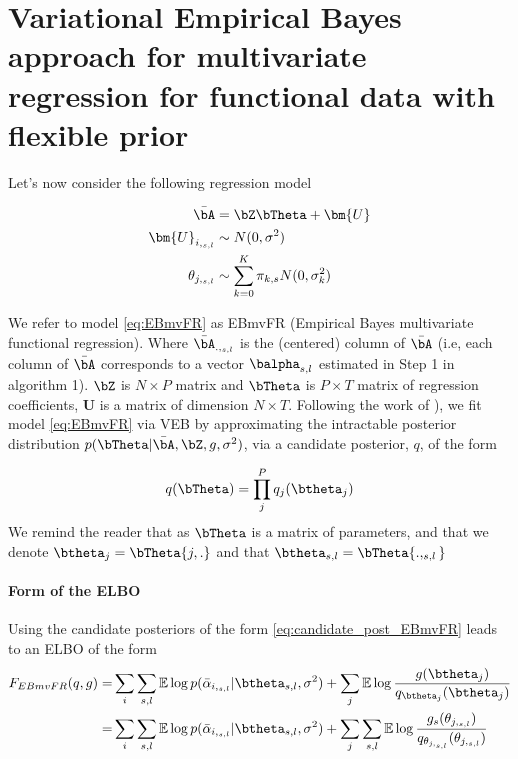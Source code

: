  
 
\section{Variational Empirical Bayes approach for multivariate  regression for functional data  with flexible prior}\label{sec:EBmvFR}
Let's now consider the following regression model

\begin{align}
    \bar{\bA} & = \bZ  \bTheta+\bm{U}  \label{eq:EBmvFR}\\
    \bm{U}_{i,_{s,l}} &   \sim N(0,\sigma^2) \\
    \theta_{j,_{ s,l}} &  \sim \sum_{k=0}^K \pi_{k ,s} N(0,\sigma_{k }^2)\\
\end{align}

We refer to model \ref{eq:EBmvFR} as EBmvFR (Empirical Bayes multivariate functional regression). Where  $ \bar{\bA}_{.,_{s,l}}$ is the (centered) column of $\bar{\bA}$  (i.e, each column of $\bar{\bA}$ corresponds to a vector $\balpha_{s,l}$ estimated in Step 1 in algorithm 1).   $\bZ$ is $N\times P$ matrix and  $ \bTheta$ is $P\times T$ matrix of regression coefficients,  $\bm{U}$ is a matrix of dimension $N\times T$.  Following the work of \cite{kim_flexible_2022}), we fit model \ref{eq:EBmvFR} via VEB by approximating the intractable posterior distribution
$    p(\bTheta |\bar{\bA}  ,\bZ,g, \sigma^2)  $, via a candidate posterior, $q$, of the form

\begin{align}
    q(\bTheta) = \prod_j^P q_j(\btheta_j)\label{eq:candidate_post_EBmvFR}
\end{align}
We remind the reader that as $\bTheta$ is a matrix of parameters, and that we denote  $\btheta_j = \bTheta{j,.}  $ and that $\btheta_{s,l} = \bTheta{.,_{s,l}}  $
\paragraph{Form of the  ELBO}
Using   the candidate posteriors of the form \ref{eq:candidate_post_EBmvFR}  leads to an ELBO of the form
\begin{align}
     F_{EBmvFR}(q, g) =   &\sum_i\sum_{s,l} \mathbb{E}  \log p(\bar{\alpha}_{i,_{s,l}}|\btheta_{ s,l}, \sigma^2) +\sum_j  \mathbb{E} \log \frac{g(\btheta_{j}) }{q_{\btheta_{j}} (\btheta_{j})}       \\ 
     =&\sum_i\sum_{s,l} \mathbb{E}  \log p(\bar{\alpha}_{i,_{s,l}}|\btheta_{ s,l}, \sigma^2) +\sum_j \sum_{s,l} \mathbb{E} \log \frac{g_{s} (\theta_{j,_{ s,l}}) }{q_{\theta_{j,_{ s,l}}} (\theta_{j,_{ s,l}})} 
\end{align}

